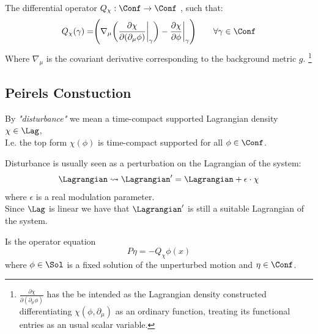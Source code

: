 \documentclass[a4paper,11pt]{scrartcl}
\begin{document}
	\begin{definition}
		The  differential operator $Q_\chi : \Conf \rightarrow \Conf$	, such that:
		\begin{displaymath}
			Q_\chi (\gamma) = \Biggr( \nabla_\mu \biggr( \frac{\partial \chi}{\partial(\partial_\mu \phi)} \biggr\vert_\gamma \biggr) - \frac{\partial \chi}{\partial \phi}\biggr\vert_\gamma \Biggr) \qquad \forall \gamma \in \Conf	
		\end{displaymath}
		Where $\nabla_\mu$ is the covariant derivative corresponding to the background metric $g$.
		\footnote{$\frac{\partial \chi}{\partial(\partial_\mu \phi)}$ has the be intended as the Lagrangian density constructed differentiating $\chi(\phi, \partial_\mu)$ as an ordinary function, treating its functional entries as an usual scalar variable.}
	\end{definition}

	\subsection*{Peirels Constuction}

	\begin{definition}[Disturbance]
		By \emph{"disturbance"} we mean a time-compact supported Lagrangian density $\chi \in \Lag$,\\
		I.e. the top form $\chi(\phi)$ is time-compact supported for all $\phi \in \Conf$.
	\end{definition}

	\begin{remark}
	 Disturbance is usually seen as a perturbation on the Lagrangian of the system:
		\begin{displaymath}
			\Lagrangian \rightsquigarrow \Lagrangian' = \Lagrangian + \epsilon\cdot \chi
		\end{displaymath}
		where $\epsilon$  is a real modulation parameter.\\
		Since $\Lag$ is linear we have that $\Lagrangian'$ is still a suitable Lagrangian of the system.	
	\end{remark}

	\begin{definition}
		Is the operator equation
		\begin{equation}\label{PeierlJacobiEqLin}
			P \eta = - Q_\chi \phi(x)
		\end{equation}
		where $\phi \in \Sol$ is a fixed solution of the unperturbed motion and $\eta \in \Conf$.
	\end{definition}
	
\end{document}
